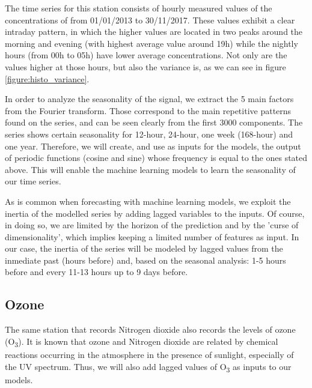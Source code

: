 \documentclass[a4paper,twocolumn,5p]{elsarticle}
\begin{document}
The time series for this station consists of hourly measured values of
the concentrations of \no from 01/01/2013 to
30/11/2017. These values exhibit a clear intraday pattern, in which
the higher values are located in two peaks around the morning and
evening (with highest average value around 19h) while the nightly
hours (from 00h to 05h) have lower average concentrations.  Not only
are the values higher at those hours, but also the variance is, as we
can see in figure \ref{figure:histo_variance}.
 
In order to analyze the seasonality of the signal, we extract the 5
main factors from the Fourier transform. Those correspond to the main
repetitive patterns found on the series, and can be seen clearly from
the first 3000 components. The series shows certain seasonality for
12-hour, 24-hour, one week (168-hour) and one year.  Therefore, we will
create, and use as inputs for the models, the output of periodic
functions (cosine and sine) whose frequency is equal to the ones
stated above. This will enable the machine learning models to learn
the seasonality of our time series.

As is common when forecasting with machine learning models, we exploit
the inertia of the modelled series by adding lagged variables to the
inputs. Of course, in doing so, we are limited by the horizon of the
prediction and by the 'curse of dimensionality', which implies keeping
a limited number of features as input. In our case, the inertia of the
series will be modeled by lagged values from the inmediate past (hours
before) and, based on the seasonal analysis: 1-5 hours before and
every 11-13 hours up to 9 days before.

\subsection{Ozone}


The same station that records Nitrogen dioxide also records the levels
of ozone (O\textsubscript{3}). It is known that ozone and Nitrogen
dioxide are related by chemical reactions occurring in the atmosphere
in the presence of sunlight, especially of the UV spectrum.  %
Thus, we will also add lagged values of O\textsubscript{3} as inputs
to our models.
\end{document}
